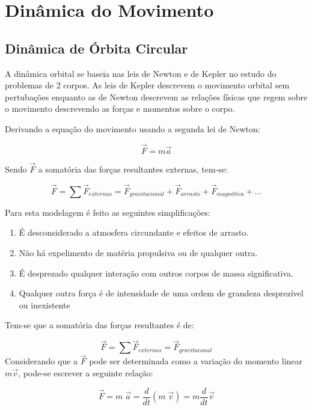 \section{Dinâmica do Movimento}\label{sec:3.1.3}

\subsection{Dinâmica de Órbita Circular}\label{sec:3.1.3.1}

A dinâmica orbital se baseia nas leis de Newton e de Kepler no estudo do problemas de 2 corpos. As leis de Kepler descrevem o movimento orbital sem pertubações enquanto as de Newton descrevem as relações físicas que regem sobre o movimento descrevendo as forças e momentos sobre o corpo.

Derivando a equação do movimento usando a segunda lei de Newton:

\begin{equation}
\vec{F}=m\vec{a}
\end{equation}

Sendo $\vec{F}$ a somatória das forças resultantes externas, tem-se:

\begin{equation}
\vec{F}=\sum\vec{F}_{externas}=\vec{F}_{gravitacional}+\vec{F}_{arrasto}+\vec{F}_{magnética}+...
\end{equation}

Para esta modelagem é feito as seguintes simplificações:
\begin{enumerate}
\item É desconsiderado a atmosfera circundante e efeitos de arrasto.
\item Não há expelimento de matéria propulsiva ou de qualquer outra.
\item É desprezado qualquer interação com outros corpos de massa significativa.
\item Qualquer outra força é de intensidade de uma ordem de grandeza desprezível ou inexistente
\end{enumerate}

Tem-se que a somatória das forças resultantes é de:

\begin{equation}
\vec{F}=\sum\vec{F}_{externas}=\vec{F}_{gravitaconal}
\end{equation}Considerando que a $\vec{F}$ pode ser determinada como a variação do momento linear $m\vec{v}$, pode-se escrever a seguinte relação:

\begin{equation}\vec{F}=m\;\vec{a} = \frac{d}{dt}(m\;\vec{v})=m\frac{d}{dt}\vec{v}\end{equation}

